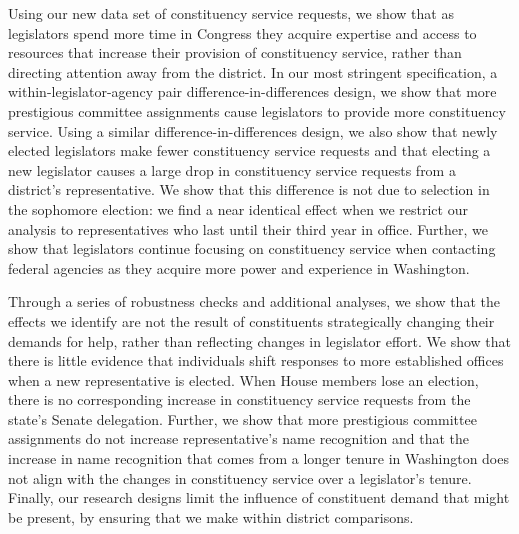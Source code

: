 \documentclass{article}
\begin{document}
Using our new data set of constituency service requests, we show that as legislators spend more time in Congress they acquire expertise and access to resources that increase their provision of constituency service, rather than directing attention away from the district.  In our most stringent specification, a within-legislator-agency pair difference-in-differences design, we show that more prestigious committee assignments cause legislators to provide more constituency service.  Using a similar difference-in-differences design, we also show that newly elected legislators make fewer constituency service requests and that electing a new legislator causes a large drop in constituency service requests from a district's representative.  We show that this difference is not due to selection in the sophomore election: we find a near identical effect when we restrict our analysis to representatives who last until their third year in office.  Further, we show that legislators continue focusing on constituency service when contacting federal agencies as they acquire more power and experience in Washington.  

Through a series of robustness checks and additional analyses, we show that the effects we identify are not the result of constituents strategically changing their demands for help, rather than reflecting changes in legislator effort.  We show that there is little evidence that individuals shift responses to more established offices when a new representative is elected.  When House members lose an election, there is no corresponding increase in constituency service requests from the state's Senate delegation.  Further, we show that more prestigious committee assignments do not increase representative's name recognition and that the increase in name recognition that comes from a longer tenure in Washington does not align with the changes in constituency service over a legislator's tenure.  Finally, our research designs limit the influence of constituent demand that might be present, by ensuring that we make within district comparisons.  
\end{document}
